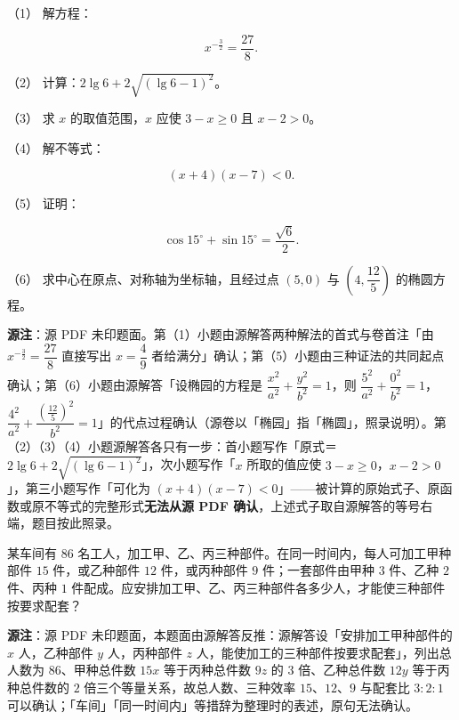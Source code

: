 \begin{question}

（1） 解方程：

\nopagebreak[4]
\[
x^{-\frac{3}{2}}=\frac{27}{8}.
\]

（2） 计算：$2\lg6+2\sqrt{(\lg6-1)^2}$。

（3） 求 $x$ 的取值范围，$x$ 应使 $3-x\ge0$ 且 $x-2>0$。

（4） 解不等式：

\nopagebreak[4]
\[
(x+4)(x-7)<0.
\]

（5） 证明：

\nopagebreak[4]
\[
\cos15^\circ+\sin15^\circ=\frac{\sqrt6}{2}.
\]

（6） 求中心在原点、对称轴为坐标轴，且经过点 $(5,0)$ 与 $\left(4,\dfrac{12}{5}\right)$ 的椭圆方程。

\begin{gktip}
\textbf{源注}：源 PDF 未印题面。第（1）小题由源解答两种解法的首式与卷首注「由 $x^{-\frac32}=\dfrac{27}{8}$ 直接写出 $x=\dfrac49$ 者给满分」确认；第（5）小题由三种证法的共同起点确认；第（6）小题由源解答「设椭园的方程是 $\dfrac{x^2}{a^2}+\dfrac{y^2}{b^2}=1$，则 $\dfrac{5^2}{a^2}+\dfrac{0^2}{b^2}=1$，$\dfrac{4^2}{a^2}+\dfrac{\left(\frac{12}{5}\right)^2}{b^2}=1$」的代点过程确认（源卷以「椭园」指「椭圆」，照录说明）。第（2）（3）（4）小题源解答各只有一步：首小题写作「原式＝$2\lg6+2\sqrt{(\lg6-1)^2}$」，次小题写作「$x$ 所取的值应使 $3-x\ge0$，$x-2>0$」，第三小题写作「可化为 $(x+4)(x-7)<0$」——被计算的原始式子、原函数或原不等式的完整形式\textbf{无法从源 PDF 确认}，上述式子取自源解答的等号右端，题目按此照录。
\end{gktip}

\end{question}
\begin{question}
某车间有 $86$ 名工人，加工甲、乙、丙三种部件。在同一时间内，每人可加工甲种部件 $15$ 件，或乙种部件 $12$ 件，或丙种部件 $9$ 件；一套部件由甲种 $3$ 件、乙种 $2$ 件、丙种 $1$ 件配成。应安排加工甲、乙、丙三种部件各多少人，才能使三种部件按要求配套？

\begin{gktip}
\textbf{源注}：源 PDF 未印题面，本题面由源解答反推：源解答设「安排加工甲种部件的 $x$ 人，乙种部件 $y$ 人，丙种部件 $z$ 人，能使加工的三种部件按要求配套」，列出总人数为 $86$、甲种总件数 $15x$ 等于丙种总件数 $9z$ 的 $3$ 倍、乙种总件数 $12y$ 等于丙种总件数的 $2$ 倍三个等量关系，故总人数、三种效率 $15$、$12$、$9$ 与配套比 $3:2:1$ 可以确认；「车间」「同一时间内」等措辞为整理时的表述，原句无法确认。
\end{gktip}

\end{question}
